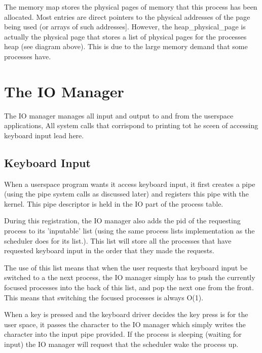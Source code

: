 \documentclass[a4paper]{report}
\begin{document}
The memory map stores the physical pages of memory that this process has been allocated. Most entries are direct pointers to the physical addresses of the page being used (or arrays of such addresses]. However, the heap\_physical\_page is actually the physical page that stores a list of physical pages for the processes heap (see diagram above). This is due to the large memory demand that some processes have.







\clearpage

\section{The IO Manager}

The IO manager manages all input and output to and from the userspace applications, All system calls that corrispond to printing tot he sceen of accessing keyboard input lead here.

\subsection{Keyboard Input}

When a userspace program wants it access keyboard input, it first creates a pipe (using the pipe system calls as discussed later) and registers this pipe with the kernel. This pipe descriptor is held in the IO part of the process table.

During this registration, the IO manager also adds the pid of the requesting process to its 'inputable' list (using the same process lists implementation as the scheduler does for its list.). This list will store all the processes that have requested keyboard input in the order that they made the requests.

The use of this list means that when the user requests that keyboard input be switched to a the next process, the IO manager simply has to push the currently focused processes into the back of this list, and pop the next one from the front. This means that switching the focused processes is always O(1).

When a key is pressed and the keyboard driver decides the key press is for the user space, it passes the character to the IO manager which simply writes the character into the input pipe provided. If the process is sleeping (waiting for input) the IO manager will request that the scheduler wake the process up.
\end{document}
